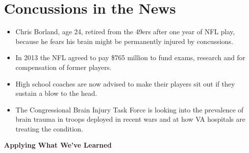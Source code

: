 \def\theTopic{Effects of Concussion }
\def\dayNum{27 }

\section{ Concussions in the News}


\begin{itemize}
\item 
Chris Borland, age 24,  retired from the 49ers after one year of
NFL play, because he fears his brain might be permanently injured by
concussions.
\item In 2013 the NFL agreed to pay \$765 million to fund exams,
  research and for compensation of former players.
\item High school coaches are now advised to make their
  players sit out if they sustain a blow to the head. 
\item The Congressional Brain Injury Task Force is looking into 
  the prevalence of brain trauma in troops deployed in recent wars and
  at how VA hospitals are treating the condition.
\end{itemize}

\begin{center}
  {\large\bf Applying What We've Learned}
\end{center}


